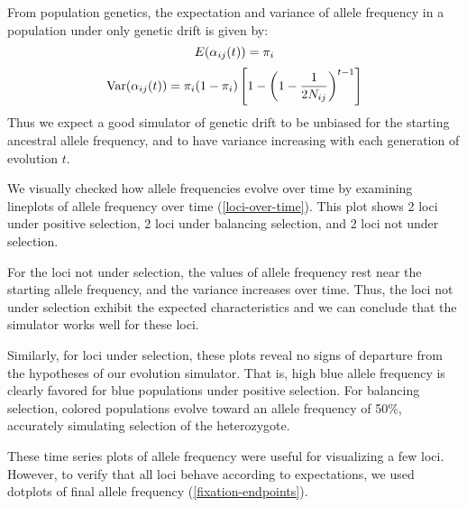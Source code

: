 \documentclass[a4paper,12pt]{article}
\begin{document}
From population genetics, the expectation and variance of allele
frequency in a population under only genetic drift is given by:
$$E(\alpha_{ij}(t))=\pi_i$$
$$\operatorname{Var}(\alpha_{ij}(t))=\pi_i(1-\pi_i)
\left[1-\left(1-\frac{1}{2N_{ij}}\right)^{t-1}\right]$$
Thus we expect a good simulator of genetic drift to be unbiased for
the starting ancestral allele frequency, and to have variance
increasing with each generation of evolution $t$.

We visually checked how allele frequencies evolve over time by
examining lineplots of allele frequency over time
(\autoref{loci-over-time}). This plot shows 2 loci under positive
selection, 2 loci under balancing selection, and 2 loci not under
selection.


For the loci not under selection, the values of allele frequency rest
near the starting allele frequency, and the variance increases over
time. Thus, the loci not under selection exhibit the expected
characteristics and we can conclude that the simulator works well for
these loci.

Similarly, for loci under selection, these plots reveal no signs of
departure from the hypotheses of our evolution simulator. That is,
high blue allele frequency is clearly favored for blue populations
under positive selection. For balancing selection, colored populations
evolve toward an allele frequency of 50\%, accurately simulating
selection of the heterozygote.

These time series plots of allele frequency were useful for
visualizing a few loci. However, to verify that all loci behave
according to expectations, we used dotplots of final allele frequency
(\autoref{fixation-endpoints}).

\end{document}
